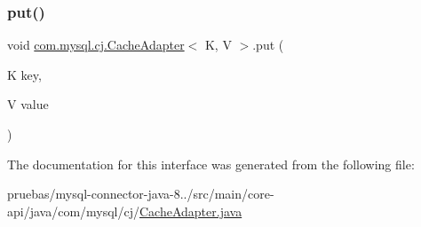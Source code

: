 \mbox{\label{interfacecom_1_1mysql_1_1cj_1_1_cache_adapter_a4f9009be8c604a82869b84dc545d06f8}} 
\subsubsection{\texorpdfstring{put()}{put()}}
{\footnotesize\ttfamily void \mbox{\hyperlink{interfacecom_1_1mysql_1_1cj_1_1_cache_adapter}{com.\+mysql.\+cj.\+Cache\+Adapter}}$<$ K, V $>$.put (\begin{DoxyParamCaption}\item[{K}]{key,  }\item[{V}]{value }\end{DoxyParamCaption})}



The documentation for this interface was generated from the following file\+:\begin{DoxyCompactItemize}
\item 
pruebas/mysql-\/connector-\/java-\/8../src/main/core-\/api/java/com/mysql/cj/\mbox{\hyperlink{_cache_adapter_8java}{Cache\+Adapter.\+java}}\end{DoxyCompactItemize}
